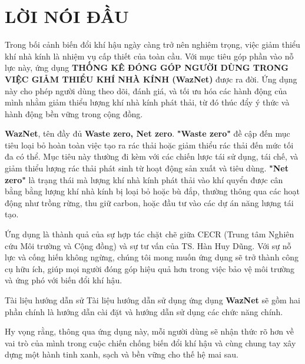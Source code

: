 \section*{LỜI NÓI ĐẦU} %
\thispagestyle{empty}

Trong bối cảnh biến đổi khí hậu ngày càng trở nên nghiêm trọng, việc giảm thiểu khí nhà kính là nhiệm vụ cấp thiết của toàn cầu. Với mục tiêu góp phần vào nỗ lực này, ứng dụng \textbf{THỐNG KÊ ĐÓNG GÓP
NGƯỜI DÙNG TRONG VIỆC GIẢM THIỂU KHÍ NHÀ KÍNH (WazNet)} được ra đời. Ứng dụng này cho phép người dùng theo dõi, đánh giá, và tối ưu hóa các hành động của mình nhằm giảm thiểu lượng khí nhà kính phát thải, từ đó thúc đẩy ý thức và hành động bền vững trong cộng đồng.

\textbf{WazNet}, tên đầy đủ \textbf{Waste zero, Net zero}. \textbf{"Waste zero"} đề cập đến mục tiêu loại bỏ hoàn toàn việc tạo ra rác thải hoặc giảm thiểu rác thải đến mức tối đa có thể. Mục tiêu này thường đi kèm với các chiến lược tái sử dụng, tái chế, và giảm thiểu lượng rác thải phát sinh từ hoạt động sản xuất và tiêu dùng. \textbf{"Net zero"} là trạng thái mà lượng khí nhà kính phát thải vào khí quyển được cân bằng bằng lượng khí nhà kính bị loại bỏ hoặc bù đắp, thường thông qua các hoạt động như trồng rừng, thu giữ carbon, hoặc đầu tư vào các dự án năng lượng tái tạo.

Ứng dụng là thành quả của sự hợp tác chặt chẽ giữa CECR (Trung tâm Nghiên cứu Môi trường và Cộng đồng) và sự tư vấn của TS. Hàn Huy Dũng. Với sự nỗ lực và cống hiến không ngừng, chúng tôi mong muốn ứng dụng sẽ trở thành công cụ hữu ích, giúp mọi người đóng góp hiệu quả hơn trong việc bảo vệ môi trường và ứng phó với biến đổi khí hậu.

Tài liệu hướng dẫn sử Tài liệu hướng dẫn sử dụng ứng dụng \textbf{WazNet} sẽ gồm hai phần chính là hướng dẫn cài đặt và hướng dẫn sử dụng các chức năng chính.

Hy vọng rằng, thông qua ứng dụng này, mỗi người dùng sẽ nhận thức rõ hơn về vai trò của mình trong cuộc chiến chống biến đổi khí hậu và cùng chung tay xây dựng một hành tinh xanh, sạch và bền vững cho thế hệ mai sau.

\cleardoublepage
